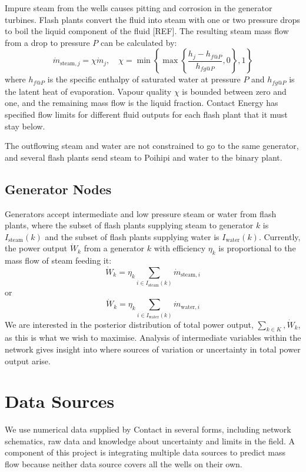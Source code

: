 \documentclass[a4paper, 12pt]{article}
\newlength{\drop}
\begin{document}
Impure steam from the wells causes pitting and corrosion in the generator turbines. Flash plants convert the fluid into steam with one or two pressure drops to boil the liquid component of the fluid [REF]. The resulting steam mass flow from a drop to pressure $P$ can be calculated by:
\begin{equation}
\dot{m}_{\text{steam},j} = \chi\dot{m}_j,\quad \chi= \min{\left\{\max{\left\{\frac{h_j - h_{f@P}}{h_{fg@P}}, 0\right\}}, 1\right\}}
\end{equation}
where $h_{f@P}$ is the specific enthalpy of saturated water at pressure $P$ and $h_{fg@P}$ is the latent heat of evaporation. Vapour quality $\chi$ is bounded between zero and one, and the remaining mass flow is the liquid fraction. Contact Energy has specified flow limits for different fluid outputs for each flash plant that it must stay below.

The outflowing steam and water are not constrained to go to the same generator, and several flash plants send steam to Poihipi and water to the binary plant.

\subsection{Generator Nodes}
Generators accept intermediate and low pressure steam or water from flash plants, where the subset of flash plants supplying steam to generator $k$ is $I_{\text{steam}}(k)$ and the subset of flash plants supplying water is $I_{\text{water}}(k)$. Currently, the power output $\dot{W}_k$ from a generator $k$ with efficiency $\eta_k$ is proportional to the mass flow of steam feeding it:
\begin{equation}
\dot{W}_k = \eta_k \sum_{i\in I_{\text{steam}}(k)} \dot{m}_{\text{steam},i}
\end{equation}
or
\begin{equation}
\dot{W}_k = \eta_k \sum_{i\in I_{\text{water}}(k)} \dot{m}_{\text{water},i} \label{eq:power}
\end{equation}
We are interested in the posterior distribution of total power output, $\sum_{k\in K}, \dot{W}_k$, as this is what we wish to maximise. Analysis of intermediate variables within the network gives insight into where sources of variation or uncertainty in total power output arise.

\section{Data Sources}
We use numerical data supplied by Contact in several forms, including network schematics, raw data and knowledge about uncertainty and limits in the field. A component of this project is integrating multiple data sources to predict mass flow because neither data source covers all the wells on their own.
\end{document}
